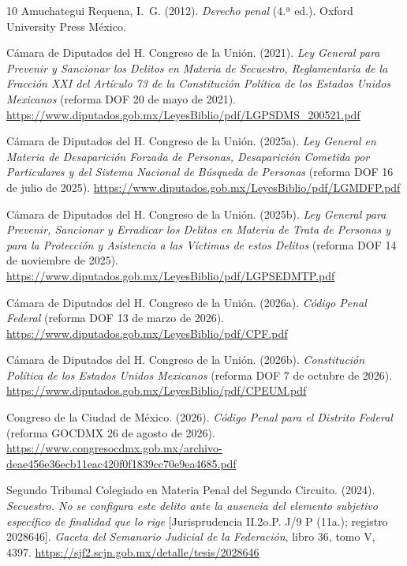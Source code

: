 \documentclass[spanish,letterpaper,oneside]{article}
\begin{document}
\clearpage
\begingroup\fontsize{10}{11.5}\selectfont
\setlength{\bibsep}{4pt}
\begin{thebibliography}{10}
Amuchategui Requena, I.~G. (2012). \emph{Derecho penal} (4.ª ed.). Oxford University Press México.

Cámara de Diputados del H. Congreso de la Unión. (2021). \emph{Ley General para Prevenir y Sancionar los Delitos en Materia de Secuestro, Reglamentaria de la Fracción XXI del Artículo 73 de la Constitución Política de los Estados Unidos Mexicanos} (reforma DOF 20 de mayo de 2021). \url{https://www.diputados.gob.mx/LeyesBiblio/pdf/LGPSDMS_200521.pdf}

Cámara de Diputados del H. Congreso de la Unión. (2025a). \emph{Ley General en Materia de Desaparición Forzada de Personas, Desaparición Cometida por Particulares y del Sistema Nacional de Búsqueda de Personas} (reforma DOF 16 de julio de 2025). \url{https://www.diputados.gob.mx/LeyesBiblio/pdf/LGMDFP.pdf}

Cámara de Diputados del H. Congreso de la Unión. (2025b). \emph{Ley General para Prevenir, Sancionar y Erradicar los Delitos en Materia de Trata de Personas y para la Protección y Asistencia a las Víctimas de estos Delitos} (reforma DOF 14 de noviembre de 2025). \url{https://www.diputados.gob.mx/LeyesBiblio/pdf/LGPSEDMTP.pdf}

Cámara de Diputados del H. Congreso de la Unión. (2026a). \emph{Código Penal Federal} (reforma DOF 13 de marzo de 2026). \url{https://www.diputados.gob.mx/LeyesBiblio/pdf/CPF.pdf}

Cámara de Diputados del H. Congreso de la Unión. (2026b). \emph{Constitución Política de los Estados Unidos Mexicanos} (reforma DOF 7 de octubre de 2026). \url{https://www.diputados.gob.mx/LeyesBiblio/pdf/CPEUM.pdf}

Congreso de la Ciudad de México. (2026). \emph{Código Penal para el Distrito Federal} (reforma GOCDMX 26 de agosto de 2026). \url{https://www.congresocdmx.gob.mx/archivo-deae456e36ecb11eac420f0f1839cc70e9ea4685.pdf}

Segundo Tribunal Colegiado en Materia Penal del Segundo Circuito. (2024). \emph{Secuestro. No se configura este delito ante la ausencia del elemento subjetivo específico de finalidad que lo rige} [Jurisprudencia II.2o.P. J/9 P (11a.); registro 2028646]. \emph{Gaceta del Semanario Judicial de la Federación}, libro 36, tomo V, 4397. \url{https://sjf2.scjn.gob.mx/detalle/tesis/2028646}


\end{thebibliography}
\end{document}
